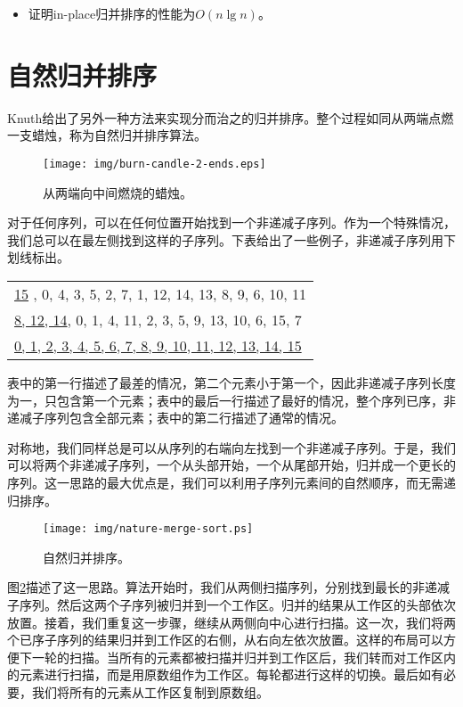 \documentclass[UTF8]{article}
\begin{document}
\begin{Exercise}
\begin{itemize}
\item 证明in-place归并排序的性能为$O(n \lg n)$。
\end{itemize}
\end{Exercise}

\section{自然归并排序}

Knuth给出了另外一种方法来实现分而治之的归并排序。整个过程如同从两端点燃一支蜡烛\cite{TAOCP}，称为自然归并排序算法。

\begin{figure}[htbp]
 \centering
 \texttt{[image: img/burn-candle-2-ends.eps]}
 \caption{从两端向中间燃烧的蜡烛。}
 \label{fig:burn-candle}
\end{figure}

对于任何序列，可以在任何位置开始找到一个非递减子序列。作为一个特殊情况，我们总可以在最左侧找到这样的子序列。下表给出了一些例子，非递减子序列用下划线标出。

\begin{tabular}{ | l |}
\hline
\underline{15} , 0, 4, 3, 5, 2, 7, 1, 12, 14, 13, 8, 9, 6, 10, 11 \\
\underline{8, 12, 14}, 0, 1, 4, 11, 2, 3, 5, 9, 13, 10, 6, 15, 7 \\
\underline{0, 1, 2, 3, 4, 5, 6, 7, 8, 9, 10, 11, 12, 13, 14, 15} \\
\hline
\end{tabular}

表中的第一行描述了最差的情况，第二个元素小于第一个，因此非递减子序列长度为一，只包含第一个元素；表中的最后一行描述了最好的情况，整个序列已序，非递减子序列包含全部元素；表中的第二行描述了通常的情况。

对称地，我们同样总是可以从序列的右端向左找到一个非递减子序列。于是，我们可以将两个非递减子序列，一个从头部开始，一个从尾部开始，归并成一个更长的序列。这一思路的最大优点是，我们可以利用子序列元素间的自然顺序，而无需递归排序。

\begin{figure}[htbp]
 \centering
 \texttt{[image: img/nature-merge-sort.ps]}
 \caption{自然归并排序。}
 \label{fig:nature-merge-sort}
\end{figure}

图\ref{fig:nature-merge-sort}描述了这一思路。算法开始时，我们从两侧扫描序列，分别找到最长的非递减子序列。然后这两个子序列被归并到一个工作区。归并的结果从工作区的头部依次放置。接着，我们重复这一步骤，继续从两侧向中心进行扫描。这一次，我们将两个已序子序列的结果归并到工作区的右侧，从右向左依次放置。这样的布局可以方便下一轮的扫描。当所有的元素都被扫描并归并到工作区后，我们转而对工作区内的元素进行扫描，而是用原数组作为工作区。每轮都进行这样的切换。最后如有必要，我们将所有的元素从工作区复制到原数组。
\end{document}
